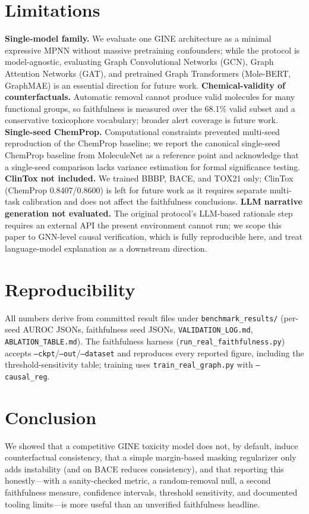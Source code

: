 \documentclass[conference]{IEEEtran}
\newcommand{\ChemClin}{0.8407/0.8600}
\begin{document}
\section{Limitations}
\textbf{Single-model family.} We evaluate one GINE architecture as a minimal expressive MPNN without massive pretraining confounders; while the protocol is model-agnostic, evaluating Graph Convolutional Networks (GCN), Graph Attention Networks (GAT), and pretrained Graph Transformers (Mole-BERT, GraphMAE) is an essential direction for future work. \textbf{Chemical-validity of counterfactuals.} Automatic removal cannot produce valid molecules for many functional groups, so faithfulness is measured over the 68.1\% valid subset and a conservative toxicophore vocabulary; broader alert coverage is future work. \textbf{Single-seed ChemProp.} Computational constraints prevented multi-seed reproduction of the ChemProp baseline; we report the canonical single-seed ChemProp baseline from MoleculeNet as a reference point and acknowledge that a single-seed comparison lacks variance estimation for formal significance testing. \textbf{ClinTox not included.} We trained BBBP, BACE, and TOX21 only; ClinTox (ChemProp \ChemClin) is left for future work as it requires separate multi-task calibration and does not affect the faithfulness conclusions. \textbf{LLM narrative generation not evaluated.} The original protocol's LLM-based rationale step requires an external API the present environment cannot run; we scope this paper to GNN-level causal verification, which is fully reproducible here, and treat language-model explanation as a downstream direction.

\section{Reproducibility}
All numbers derive from committed result files under \texttt{benchmark\_results/} (per-seed AUROC JSONs, faithfulness seed JSONs, \texttt{VALIDATION\_LOG.md}, \texttt{ABLATION\_TABLE.md}). The faithfulness harness (\texttt{run\_real\_faithfulness.py}) accepts \texttt{--ckpt}/\texttt{--out}/\texttt{--dataset} and reproduces every reported figure, including the threshold-sensitivity table; training uses \texttt{train\_real\_graph.py} with \texttt{--causal\_reg}.

\section{Conclusion}
We showed that a competitive GINE toxicity model does not, by default, induce counterfactual consistency, that a simple margin-based masking regularizer only adds instability (and on BACE reduces consistency), and that reporting this honestly---with a sanity-checked metric, a random-removal null, a second faithfulness measure, confidence intervals, threshold sensitivity, and documented tooling limits---is more useful than an unverified faithfulness headline.



\end{document}
